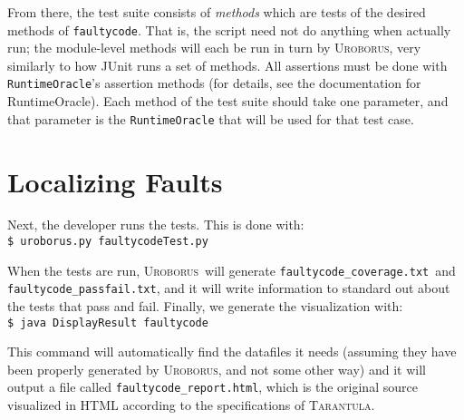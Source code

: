 \documentclass[english]{article}
\newcommand{\Uro}{\textsc{Uroborus}}
\newcommand{\Taran}{\textsc{Tarantula}}
\newcommand{\fc}{\texttt{faultycode}}
\newcommand{\fcT}{\texttt{faultycodeTest.py}}
\newcommand{\fcc}{\texttt{faultycode\_coverage.txt}}
\newcommand{\fcpf}{\texttt{faultycode\_passfail.txt}}
\newcommand{\fch}{\texttt{faultycode\_report.html}}
\begin{document}
From there, the test suite consists of \emph{methods} which are tests of the desired methods of \fc. 
That is, the script need not do anything when actually run; the module-level methods will each be
run in turn by \Uro, very similarly to how JUnit runs a set of methods.
All assertions must be
done with \texttt{RuntimeOracle}'s assertion methods (for details, see the documentation for RuntimeOracle).
Each method of the test suite should take one parameter, and that parameter is the
\texttt{RuntimeOracle} that will be used for that test case.

\section{Localizing Faults}

Next, the developer runs the tests. This is done with:\\
\texttt{\$ uroborus.py }\fcT

When the tests are run, \Uro\
will generate \fcc\ and \fcpf, and it will write information to standard out about the tests that
pass and fail. Finally, we generate the visualization with:\\
\texttt{\$ java DisplayResult }\fc

This command will automatically find the datafiles it needs (assuming they have been properly
generated by \Uro, and not some other way) and it will output a file called \fch, which is 
the original source visualized in HTML
according to the specifications of \Taran.
\end{document}
